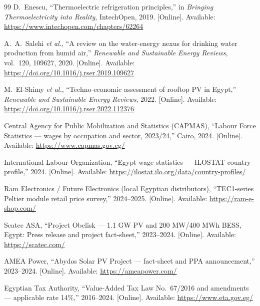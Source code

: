\documentclass[11pt,a4paper]{article}
\begin{document}
\begin{thebibliography}{99}
D.~Enescu, ``Thermoelectric refrigeration principles,'' in \emph{Bringing Thermoelectricity into Reality}, IntechOpen, 2019. [Online]. Available: \url{https://www.intechopen.com/chapters/62264}

A.~A.~Salehi \emph{et al.}, ``A review on the water-energy nexus for drinking water production from humid air,'' \emph{Renewable and Sustainable Energy Reviews}, vol.~120, 109627, 2020. [Online]. Available: \url{https://doi.org/10.1016/j.rser.2019.109627}

M.~El-Shimy \emph{et al.}, ``Techno-economic assessment of rooftop PV in Egypt,'' \emph{Renewable and Sustainable Energy Reviews}, 2022. [Online]. Available: \url{https://doi.org/10.1016/j.rser.2022.112376}

Central Agency for Public Mobilization and Statistics (CAPMAS), ``Labour Force Statistics --- wages by occupation and sector, 2023/24,'' Cairo, 2024. [Online]. Available: \url{https://www.capmas.gov.eg/}

International Labour Organization, ``Egypt wage statistics --- ILOSTAT country profile,'' 2024. [Online]. Available: \url{https://ilostat.ilo.org/data/country-profiles/}

Ram Electronics / Future Electronics (local Egyptian distributors), ``TEC1-series Peltier module retail price survey,'' 2024--2025. [Online]. Available: \url{https://ram-e-shop.com/}

Scatec ASA, ``Project Obelisk --- 1.1 GW PV and 200 MW/400 MWh BESS, Egypt: Press release and project fact-sheet,'' 2023--2024. [Online]. Available: \url{https://scatec.com/}

AMEA Power, ``Abydos Solar PV Project --- fact-sheet and PPA announcement,'' 2023--2024. [Online]. Available: \url{https://ameapower.com/}

Egyptian Tax Authority, ``Value-Added Tax Law No.~67/2016 and amendments --- applicable rate 14\%,'' 2016--2024. [Online]. Available: \url{https://www.eta.gov.eg/}

\end{thebibliography}
\end{document}
